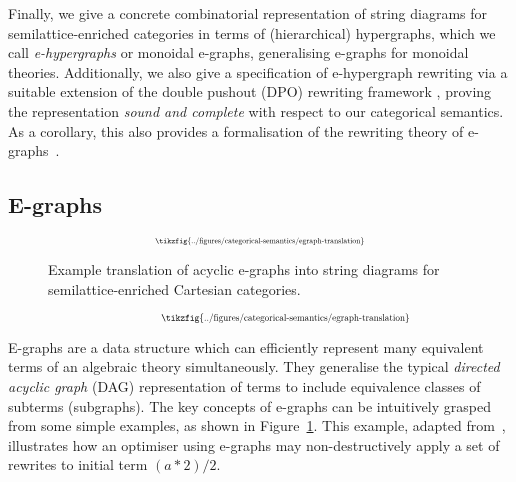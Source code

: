Finally, we give a concrete combinatorial representation of string diagrams for semilattice-enriched categories in terms of (hierarchical)  hypergraphs, which we call \textit{e-hypergraphs} or monoidal e-graphs, generalising e-graphs for monoidal theories.
Additionally, we also give a specification of e-hypergraph rewriting via a suitable extension of the double pushout (DPO) rewriting framework 
\cite{dpo, bonchi_string_2022-1,bonchi_string_2022-2,bonchi_string_2022-3},  proving the representation \textit{sound and complete} with respect to our categorical semantics.  
As a corollary, this also provides a formalisation of the rewriting theory of e-graphs~\cite{EggPaper}.

\subsection{E-graphs}

\ifdefined \ONECOLUMN
\begin{figure}
	\[
		\scalebox{0.55}{
		\tikzfig{../figures/categorical-semantics/egraph-translation}
		}
	\]
	\caption{Example translation of acyclic e-graphs into string diagrams for semilattice-enriched Cartesian categories. }
	\label{fig:e-graph-example}
	\end{figure}
\else
\begin{figure*}
\[
	\hspace{1.3cm}
    \scalebox{0.65}{
    \tikzfig{../figures/categorical-semantics/egraph-translation}
    }
\]
\captionsetup{skip=0pt, belowskip=-5mm}
\caption{Example translation of acyclic e-graphs into string diagrams for semilattice-enriched Cartesian categories. }
\label{fig:e-graph-example}
\end{figure*}
\fi

E-graphs are a data structure which can efficiently represent many equivalent terms of an algebraic theory simultaneously.
They generalise the typical \emph{directed acyclic graph} (DAG) representation of terms to include equivalence classes of subterms (subgraphs).
The key concepts of e-graphs can be intuitively grasped from some simple examples, as shown in Figure~\ref{fig:e-graph-example}.
This example, adapted from~\cite{EggPaper}, illustrates how an optimiser using e-graphs may non-destructively apply a set of rewrites to initial term $(a * 2) / 2$.

